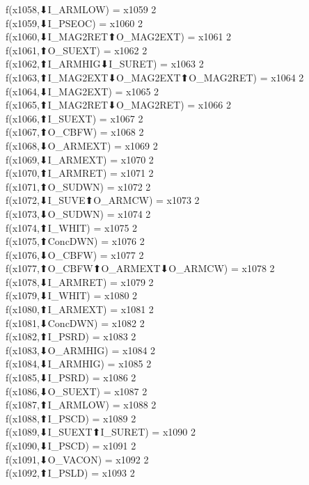 f(x1058,⬇I_ARMLOW) = x1059 {2} \\
f(x1059,⬇I_PSEOC) = x1060 {2} \\
f(x1060,⬇I_MAG2RET⬆O_MAG2EXT) = x1061 {2} \\
f(x1061,⬆O_SUEXT) = x1062 {2} \\
f(x1062,⬆I_ARMHIG⬇I_SURET) = x1063 {2} \\
f(x1063,⬆I_MAG2EXT⬇O_MAG2EXT⬆O_MAG2RET) = x1064 {2} \\
f(x1064,⬇I_MAG2EXT) = x1065 {2} \\
f(x1065,⬆I_MAG2RET⬇O_MAG2RET) = x1066 {2} \\
f(x1066,⬆I_SUEXT) = x1067 {2} \\
f(x1067,⬆O_CBFW) = x1068 {2} \\
f(x1068,⬇O_ARMEXT) = x1069 {2} \\
f(x1069,⬇I_ARMEXT) = x1070 {2} \\
f(x1070,⬆I_ARMRET) = x1071 {2} \\
f(x1071,⬆O_SUDWN) = x1072 {2} \\
f(x1072,⬇I_SUVE⬆O_ARMCW) = x1073 {2} \\
f(x1073,⬇O_SUDWN) = x1074 {2} \\
f(x1074,⬆I_WHIT) = x1075 {2} \\
f(x1075,⬆ConcDWN) = x1076 {2} \\
f(x1076,⬇O_CBFW) = x1077 {2} \\
f(x1077,⬆O_CBFW⬆O_ARMEXT⬇O_ARMCW) = x1078 {2} \\
f(x1078,⬇I_ARMRET) = x1079 {2} \\
f(x1079,⬇I_WHIT) = x1080 {2} \\
f(x1080,⬆I_ARMEXT) = x1081 {2} \\
f(x1081,⬇ConcDWN) = x1082 {2} \\
f(x1082,⬆I_PSRD) = x1083 {2} \\
f(x1083,⬇O_ARMHIG) = x1084 {2} \\
f(x1084,⬇I_ARMHIG) = x1085 {2} \\
f(x1085,⬇I_PSRD) = x1086 {2} \\
f(x1086,⬇O_SUEXT) = x1087 {2} \\
f(x1087,⬆I_ARMLOW) = x1088 {2} \\
f(x1088,⬆I_PSCD) = x1089 {2} \\
f(x1089,⬇I_SUEXT⬆I_SURET) = x1090 {2} \\
f(x1090,⬇I_PSCD) = x1091 {2} \\
f(x1091,⬇O_VACON) = x1092 {2} \\
f(x1092,⬆I_PSLD) = x1093 {2} \\
